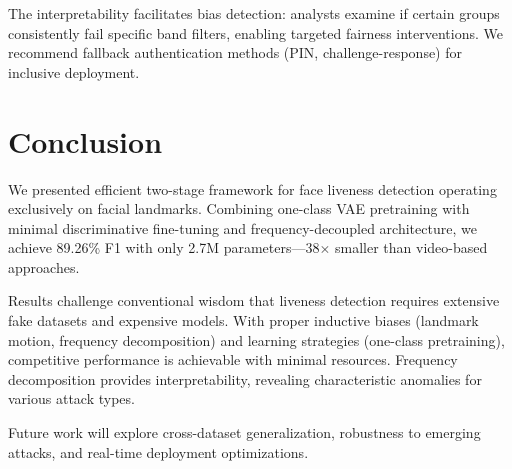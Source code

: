 \documentclass[10pt,twocolumn,letterpaper]{article}
\begin{document}
The interpretability facilitates bias detection: analysts examine if certain groups consistently fail specific band filters, enabling targeted fairness interventions. We recommend fallback authentication methods (PIN, challenge-response) for inclusive deployment.

\section{Conclusion}

We presented efficient two-stage framework for face liveness detection operating exclusively on facial landmarks. Combining one-class VAE pretraining with minimal discriminative fine-tuning and frequency-decoupled architecture, we achieve 89.26\% F1 with only 2.7M parameters—38$\times$ smaller than video-based approaches.

Results challenge conventional wisdom that liveness detection requires extensive fake datasets and expensive models. With proper inductive biases (landmark motion, frequency decomposition) and learning strategies (one-class pretraining), competitive performance is achievable with minimal resources. Frequency decomposition provides interpretability, revealing characteristic anomalies for various attack types.

Future work will explore cross-dataset generalization, robustness to emerging attacks, and real-time deployment optimizations.

{\small


}
\end{document}
